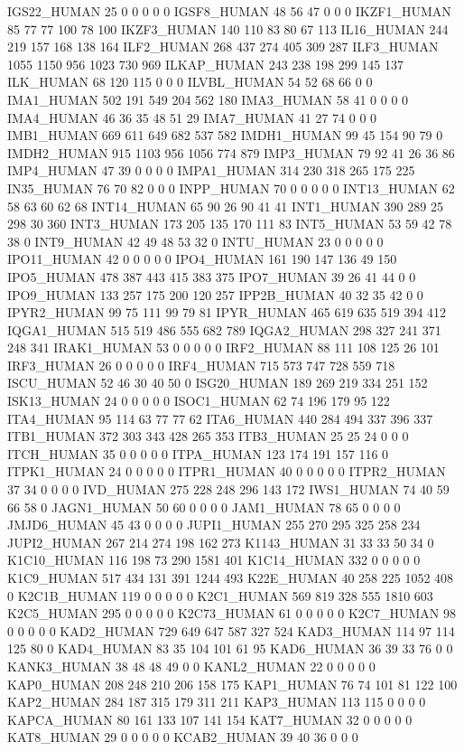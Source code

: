IGS22_HUMAN	25	0	0	0	0	0
IGSF8_HUMAN	48	56	47	0	0	0
IKZF1_HUMAN	85	77	77	100	78	100
IKZF3_HUMAN	140	110	83	80	67	113
IL16_HUMAN	244	219	157	168	138	164
ILF2_HUMAN	268	437	274	405	309	287
ILF3_HUMAN	1055	1150	956	1023	730	969
ILKAP_HUMAN	243	238	198	299	145	137
ILK_HUMAN	68	120	115	0	0	0
ILVBL_HUMAN	54	52	68	66	0	0
IMA1_HUMAN	502	191	549	204	562	180
IMA3_HUMAN	58	41	0	0	0	0
IMA4_HUMAN	46	36	35	48	51	29
IMA7_HUMAN	41	27	74	0	0	0
IMB1_HUMAN	669	611	649	682	537	582
IMDH1_HUMAN	99	45	154	90	79	0
IMDH2_HUMAN	915	1103	956	1056	774	879
IMP3_HUMAN	79	92	41	26	36	86
IMP4_HUMAN	47	39	0	0	0	0
IMPA1_HUMAN	314	230	318	265	175	225
IN35_HUMAN	76	70	82	0	0	0
INPP_HUMAN	70	0	0	0	0	0
INT13_HUMAN	62	58	63	60	62	68
INT14_HUMAN	65	90	26	90	41	41
INT1_HUMAN	390	289	25	298	30	360
INT3_HUMAN	173	205	135	170	111	83
INT5_HUMAN	53	59	42	78	38	0
INT9_HUMAN	42	49	48	53	32	0
INTU_HUMAN	23	0	0	0	0	0
IPO11_HUMAN	42	0	0	0	0	0
IPO4_HUMAN	161	190	147	136	49	150
IPO5_HUMAN	478	387	443	415	383	375
IPO7_HUMAN	39	26	41	44	0	0
IPO9_HUMAN	133	257	175	200	120	257
IPP2B_HUMAN	40	32	35	42	0	0
IPYR2_HUMAN	99	75	111	99	79	81
IPYR_HUMAN	465	619	635	519	394	412
IQGA1_HUMAN	515	519	486	555	682	789
IQGA2_HUMAN	298	327	241	371	248	341
IRAK1_HUMAN	53	0	0	0	0	0
IRF2_HUMAN	88	111	108	125	26	101
IRF3_HUMAN	26	0	0	0	0	0
IRF4_HUMAN	715	573	747	728	559	718
ISCU_HUMAN	52	46	30	40	50	0
ISG20_HUMAN	189	269	219	334	251	152
ISK13_HUMAN	24	0	0	0	0	0
ISOC1_HUMAN	62	74	196	179	95	122
ITA4_HUMAN	95	114	63	77	77	62
ITA6_HUMAN	440	284	494	337	396	337
ITB1_HUMAN	372	303	343	428	265	353
ITB3_HUMAN	25	25	24	0	0	0
ITCH_HUMAN	35	0	0	0	0	0
ITPA_HUMAN	123	174	191	157	116	0
ITPK1_HUMAN	24	0	0	0	0	0
ITPR1_HUMAN	40	0	0	0	0	0
ITPR2_HUMAN	37	34	0	0	0	0
IVD_HUMAN	275	228	248	296	143	172
IWS1_HUMAN	74	40	59	66	58	0
JAGN1_HUMAN	50	60	0	0	0	0
JAM1_HUMAN	78	65	0	0	0	0
JMJD6_HUMAN	45	43	0	0	0	0
JUPI1_HUMAN	255	270	295	325	258	234
JUPI2_HUMAN	267	214	274	198	162	273
K1143_HUMAN	31	33	33	50	34	0
K1C10_HUMAN	116	198	73	290	1581	401
K1C14_HUMAN	332	0	0	0	0	0
K1C9_HUMAN	517	434	131	391	1244	493
K22E_HUMAN	40	258	225	1052	408	0
K2C1B_HUMAN	119	0	0	0	0	0
K2C1_HUMAN	569	819	328	555	1810	603
K2C5_HUMAN	295	0	0	0	0	0
K2C73_HUMAN	61	0	0	0	0	0
K2C7_HUMAN	98	0	0	0	0	0
KAD2_HUMAN	729	649	647	587	327	524
KAD3_HUMAN	114	97	114	125	80	0
KAD4_HUMAN	83	35	104	101	61	95
KAD6_HUMAN	36	39	33	76	0	0
KANK3_HUMAN	38	48	48	49	0	0
KANL2_HUMAN	22	0	0	0	0	0
KAP0_HUMAN	208	248	210	206	158	175
KAP1_HUMAN	76	74	101	81	122	100
KAP2_HUMAN	284	187	315	179	311	211
KAP3_HUMAN	113	115	0	0	0	0
KAPCA_HUMAN	80	161	133	107	141	154
KAT7_HUMAN	32	0	0	0	0	0
KAT8_HUMAN	29	0	0	0	0	0
KCAB2_HUMAN	39	40	36	0	0	0
